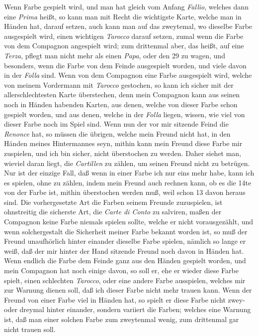 \documentclass[11pt,a6paper,twoside]{article}
\begin{document}
Wenn Farbe gespielt wird, und man hat gleich vom Anfang \textit{Fallio}, welches dann eine \textit{Prima} heißt, so kann man mit Recht die wichtigste Karte, welche man in Händen hat, darauf setzen, auch kann man auf das zweytemal, wo dieselbe Farbe ausgespielt wird, einen wichtigen \textit{Tarocco} darauf setzen, zumal wenn die Farbe von dem Compagnon angespielt wird; zum drittenmal aber, das heißt, auf eine \textit{Terza}, pflegt man nicht mehr als einen \textit{Papa}, oder den 29 zu wagen, und besonders, wenn die Farbe von dem Feinde ausgespielt worden, und viele davon in der \textit{Folla} sind. Wenn von dem Compagnon eine Farbe ausgespielt wird, welche von meinem Vordermann mit \textit{Tarocco} gestochen, so kann ich sicher mit der allerschlechtesten Karte überstechen, denn mein Compagnon kann aus seinen noch in Händen habenden Karten, aus denen, welche von dieser Farbe schon gespielt worden, und aus denen, welche in der \textit{Folla} liegen, wissen, wie viel von dieser Farbe noch im Spiel sind. Wenn nun der vor mir sitzende Feind die \textit{Renonce} hat, so müssen die übrigen, welche mein Freund nicht hat, in den Händen meines Hintermannes seyn, mithin kann mein Freund diese Farbe mir zuspielen, und ich bin sicher, nicht überstochen zu werden. Daher siehet man, wieviel daran liegt, die \textit{Cartillen} zu zählen, um seinen Freund nicht zu betrügen. Nur ist der einzige Fall, daß wenn in einer Farbe ich nur eins mehr habe, kann ich es spielen, ohne zu zählen, indem mein Freund auch rechnen kann, ob es die 14te von der Farbe ist, mithin überstochen werden muß, weil schon 13 davon heraus sind. Die vorhergesetzte Art die Farben seinem Freunde zuzuspielen, ist ohnstreitig die sicherste Art, die \textit{Carte di Conto} zu salviren, maßen der Compagnon keine Farbe niemals spielen sollte, welche er nicht vorausgezählt, und wenn solchergestalt die Sicherheit meiner Farbe bekannt worden ist, so muß der Freund unaufhörlich hinter einander dieselbe Farbe spielen, nämlich so lange er weiß, daß der mir hinter der Hand sitzende Freund noch davon in Händen hat. Wenn endlich die Farbe dem Feinde ganz aus den Händen gespielt worden, und mein Compagnon hat noch einige davon, so soll er, ehe er wieder diese Farbe spielt, einen schlechten \textit{Tarocco}, oder eine andere Farbe ausspielen, welches mir zur Warnung dienen soll, daß ich dieser Farbe nicht mehr trauen kann. Wenn der Freund von einer Farbe viel in Händen hat, so spielt er diese Farbe nicht zwey- oder dreymal hinter einander, sondern variiert die Farben; welches eine Warnung ist, daß man einer solchen Farbe zum zweytenmal wenig, zum drittenmal gar nicht trauen soll.
\end{document}
